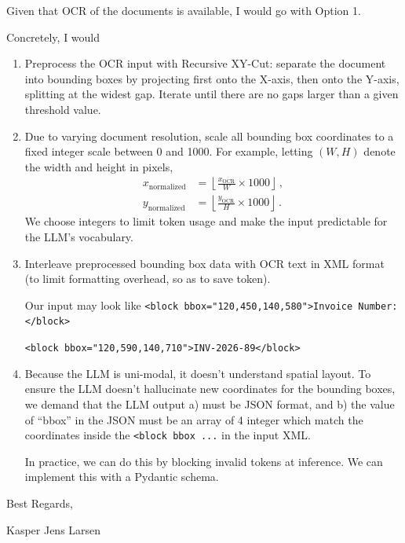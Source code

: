 \documentclass[11pt,a4paper]{article}
\numberwithin{equation}{section}
\begin{document}
Given that OCR of the documents is available, I would go with Option 1. 

Concretely, I would

\begin{enumerate}

\item Preprocess the OCR input with Recursive XY-Cut: separate the document 
into bounding boxes by projecting first onto the X-axis, then onto the Y-axis, 
splitting at the widest gap. Iterate until there are no gaps larger than a given threshold value.

\item Due to varying document resolution, scale all bounding box coordinates to 
a fixed integer scale between 0 and 1000. For example, letting $(W, H)$ denote the width and height in pixels,
\begin{align}
x_\mathrm{normalized} &= \left\lfloor \frac{x_\mathrm{OCR}}{W} \times 1000 \right\rfloor \,, \\[2mm]
y_\mathrm{normalized} &= \left\lfloor \frac{y_\mathrm{OCR}}{H} \times 1000 \right\rfloor \,.
\end{align}
We choose integers to limit token usage and make the input predictable for the LLM's
vocabulary.

\item Interleave preprocessed bounding box data with OCR text in XML format 
(to limit formatting overhead, so as to save token).

Our input may look like
\texttt{<block bbox="120,450,140,580">Invoice Number:</block>}

\texttt{<block bbox="120,590,140,710">INV-2026-89</block>}


\item Because the LLM is uni-modal, it doesn't understand spatial layout. 
To ensure the LLM doesn't hallucinate new coordinates for the bounding boxes, 
we demand that the LLM output a) must be JSON format, and b) the value of ``bbox'' 
in the JSON must be an array of 4 integer which match the coordinates inside 
the \texttt{<block bbox ...} in the input XML.

In practice, we can do this by blocking invalid tokens at inference. We can 
implement this with a Pydantic schema.



\end{enumerate}


\vspace{8mm}

\noindent Best Regards,

\noindent Kasper Jens Larsen
\end{document}
